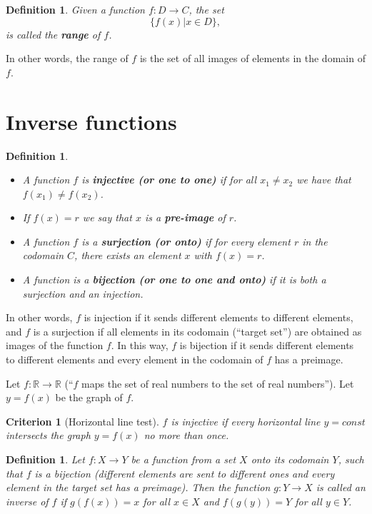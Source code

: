 \documentclass[12pt]{book}
\newtheorem{criterion}[theorem]{Criterion}
\newtheorem{definition}[theorem]{Definition}
\renewcommand{\emph}{\textbf}
\begin{document}
\begin{definition}
Given a function $f:D\to C$, the set 
\[
 \{f(x) | x\in D \},
\]
is called the \emph{range} of $f$. 
\end{definition}
In other words, the range of $f$ is the set of all images of elements in the domain of $f$.
\section{Inverse functions}

\begin{definition} ~
\begin{itemize}
\item {} A function $f$ is \emph{injective (or one to one)} if  for all $x_1\neq x_2$ we have that $f(x_1)\neq f(x_2)$. 
\item {} If $f(x)=r$ we say that $x$ is a \emph{pre-image} of $r$.
\item {}
A function $f$ is a \emph{surjection (or onto)} if for every element $r$ in the codomain $C$, there exists an element $x$ with $f(x)=r$.
\item {} A function is a \emph{bijection (or one to one and onto)} if it is both a surjection and an injection.
\end{itemize}
\end{definition}
In other words, $f$ is injection if it sends different elements to different elements, and $f$ is a surjection if all elements in its  codomain (``target set'') are obtained as images of the function $f$. In this way, $f$ is bijection if it sends different elements to different elements and every element in the codomain of $f$ has a preimage.

Let $f: \mathbb R\to \mathbb R$ (``$f$ maps the set of real numbers to the set of real numbers''). Let $y=f(x)$ be the graph of $f$.
\begin{criterion}[Horizontal line test]
$f$ is injective if every horizontal line $y=const$ intersects the graph $y=f(x)$ no more than once.
\end{criterion}

\begin{definition}
Let $f:X\to Y$ be a function from a set $X$ onto its codomain $Y$, such that $f$ is a bijection (different elements are sent to different ones and every element in the target set has a preimage). Then the function $g: Y\to X$ is called an inverse of $f$ if $g(f(x))=x$ for all $x\in X$ and $f(g(y))=Y$ for all $y\in Y$. 
\end{definition}
\end{document}
